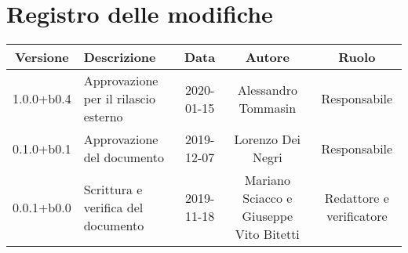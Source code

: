 \section*{Registro delle modifiche}

\begin{center}
	\begin{longtable}{|c|p{3cm}|c|c|c|}
	\hline
	\rowcolor{lighter-grayer}
	\textbf{Versione} & \textbf{Descrizione} & \textbf{Data} & \textbf{Autore} & \textbf{Ruolo} \\
	\hline
	\endfirsthead


	1.0.0+b0.4 & Approvazione per il rilascio esterno & 2020-01-15 & Alessandro Tommasin & Responsabile \\
	\hline
	0.1.0+b0.1 & Approvazione del documento & 2019-12-07 & Lorenzo Dei Negri & Responsabile \\
	\hline
	0.0.1+b0.0 & Scrittura e verifica del documento & 2019-11-18 & Mariano Sciacco e Giuseppe Vito Bitetti & Redattore e verificatore \\

	\hline

	\end{longtable}
\end{center}
